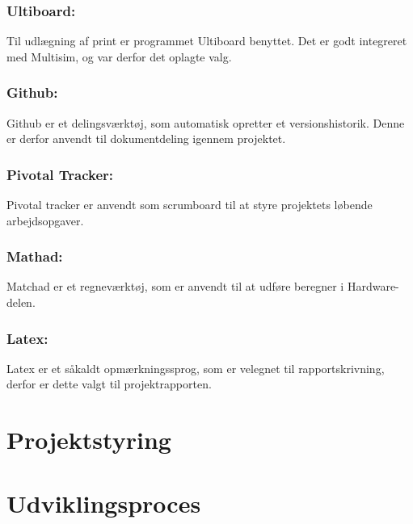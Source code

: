 \subsubsection{Ultiboard:}
Til udlægning af print er programmet Ultiboard benyttet. Det er godt integreret med Multisim, og var derfor det oplagte valg.
\subsubsection{Github:}
Github er et delingsværktøj, som automatisk opretter et versionshistorik. Denne er derfor anvendt til dokumentdeling igennem projektet. 
\subsubsection{Pivotal Tracker:}
Pivotal tracker er anvendt som scrumboard til at styre projektets løbende arbejdsopgaver. 
\subsubsection{Mathad:}
Matchad er et regneværktøj, som er anvendt til at udføre beregner i Hardware-delen. 
\subsubsection{Latex:}
Latex er et såkaldt opmærkningssprog, som er velegnet til rapportskrivning, derfor er dette valgt til projektrapporten. 


\section{Projektstyring}


\section{Udviklingsproces}
